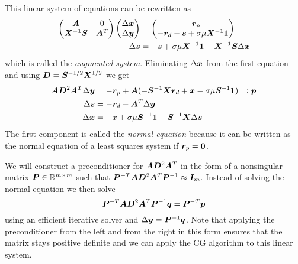 This linear system of equations can be rewritten as
\begin{subequations} \label{eqn:augmented-system}
  \begin{align}
    \begin{pmatrix}
      \bm{A}              & 0 \\
      \bm{X}^{-1} \bm{S} & \bm{A}^T \\
    \end{pmatrix}
    \begin{pmatrix}
      \Delta\bm{x} \\
      \Delta\bm{y}
    \end{pmatrix}
    &=
    \begin{pmatrix}
      -\bm{r}_p \\
      -\bm{r}_d -\bm{s} + \sigma \mu \bm{X}^{-1} \bm{1}
    \end{pmatrix} \\
    \Delta\bm{s} &= -\bm{s} + \sigma \mu \bm{X}^{-1} \bm{1} - \bm{X}^{-1} \bm{S} \Delta\bm{x}
  \end{align}
\end{subequations}
which is called the \emph{augmented system}.
Eliminating \(\Delta\bm{x}\) from the first equation and using \(\bm{D} = \bm{S}^{-1/2} \bm{X}^{1/2}\) we get
\begin{subequations} \label{eqn:normal-equation-system}
  \begin{align}
    \bm{A} \bm{D}^2 \bm{A}^T \Delta\bm{y} &= -\bm{r}_p + \bm{A} ( -\bm{S}^{-1} \bm{X} \bm{r}_d + \bm{x} - \sigma \mu \bm{S}^{-1} \bm{1} ) \eqqcolon \bm{p} \label{eqn:normal-equation} \\
    \Delta\bm{s} &= -\bm{r}_d - \bm{A}^T \Delta\bm{y} \label{eqn:s-from-normal} \\
    \Delta\bm{x} &= -x + \sigma \mu \bm{S}^{-1} \bm{1} - \bm{S}^{-1} \bm{X} \Delta\bm{s} \label{eqn:x-from-normal}
  \end{align}
\end{subequations}
The first component is called the \emph{normal equation} because it can be written as the normal equation of a least squares system if \(\bm{r}_p = \bm{0}\).

We will construct a preconditioner for \(\bm{A} \bm{D}^2 \bm{A}^T\) in the form of a nonsingular matrix \(\bm{P} \in \mathbb{R}^{m \times m}\) such that
\( \bm{P}^{-T} \bm{A} \bm{D}^2 \bm{A}^T \bm{P}^{-1} \approx \bm{I}_m \).
Instead of solving the normal equation we then solve
\begin{equation} \label{eqn:preconditioned-system}
 \bm{P}^{-T} \bm{A} \bm{D}^2 \bm{A}^T \bm{P}^{-1} \bm{q} = \bm{P}^{-T} \bm{p}
\end{equation}
using an efficient iterative solver and \(\Delta\bm{y} = \bm{P}^{-1} \bm{q}\).
Note that applying the preconditioner from the left and from the right in this form ensures that the matrix stays positive definite and we can apply the CG algorithm to this linear system.

